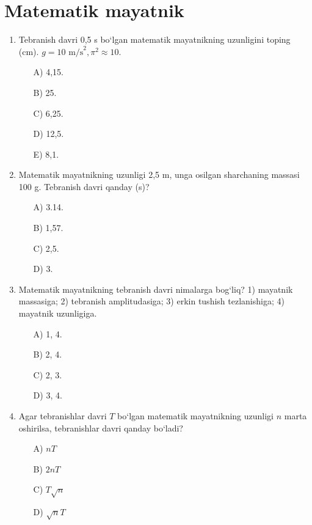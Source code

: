 \section{Matematik mayatnik}

\begin{enumerate}
    \item Tebranish davri 0,5 s bo‘lgan matematik mayatnikning uzunligini toping (cm). $g = 10 \text{ m/s}^2, \pi^2 \approx 10$.
    \begin{itemize}
        \item[A)] 4,15.
        \item[B)] 25.
        \item[C)] 6,25.
        \item[D)] 12,5.
        \item[E)] 8,1.
    \end{itemize}

    \item Matematik mayatnikning uzunligi 2,5 m, unga osilgan sharchaning massasi 100 g. Tebranish davri qanday (s)?
    \begin{itemize}
        \item[A)] 3.14.
        \item[B)] 1,57.
        \item[C)] 2,5.
        \item[D)] 3.
    \end{itemize}

    \item Matematik mayatnikning tebranish davri nimalarga bog‘liq?
    1) mayatnik massasiga; 2) tebranish amplitudasiga; 3) erkin tushish tezlanishiga; 4) mayatnik uzunligiga.
    \begin{itemize}
        \item[A)] 1, 4.
        \item[B)] 2, 4.
        \item[C)] 2, 3.
        \item[D)] 3, 4.
        
    \end{itemize}

    \item Agar tebranishlar davri $T$ bo‘lgan matematik mayatnikning uzunligi $n$ marta oshirilsa, tebranishlar davri qanday bo‘ladi?
    \begin{itemize}
        \item[A)] $nT$
        \item[B)] $2n T$
        \item[C)] $T\sqrt{n}$
        \item[D)] $\sqrt{n}T$
        

\end{itemize}
\end{enumerate}
